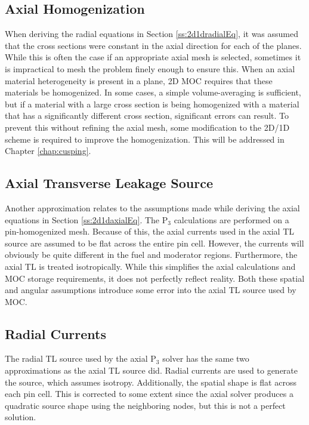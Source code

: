 \subsection{Axial Homogenization}

When deriving the radial equations in Section \ref{ss:2d1dradialEq}, it was assumed that the cross sections were constant in the axial direction for each of the planes.  While this is often the case if an appropriate axial mesh is selected, sometimes it is impractical to mesh the problem finely enough to ensure this.  When an axial material heterogeneity is present in a plane, 2D MOC requires that these materials be homogenized.  In some cases, a simple volume-averaging is sufficient, but if a material with a large cross section is being homogenized with a material that has a significantly different cross section, significant errors can result.  To prevent this without refining the axial mesh, some modification to the 2D/1D scheme is required to improve the homogenization.  This will be addressed in Chapter \ref{chap:cusping}.

\subsection{Axial Transverse Leakage Source}

Another approximation relates to the assumptions made while deriving the axial equations in Section \ref{ss:2d1daxialEq}.  The P$_3$ calculations are performed on a pin-homogenized mesh.  Because of this, the axial currents used in the axial TL source are assumed to be flat across the entire pin cell.  However, the currents will obviously be quite different in the fuel and moderator regions.  Furthermore, the axial TL is treated isotropically.  While this simplifies the axial calculations and MOC storage requirements, it does not perfectly reflect reality.  Both these spatial and angular assumptions introduce some error into the axial TL source used by MOC.

\subsection{Radial Currents}

The radial TL source used by the axial P$_3$ solver has the same two approximations as the axial TL source did.  Radial currents are used to generate the source, which assumes isotropy.  Additionally, the spatial shape is flat across each pin cell.  This is corrected to some extent since the axial solver produces a quadratic source shape using the neighboring nodes, but this is not a perfect solution.

